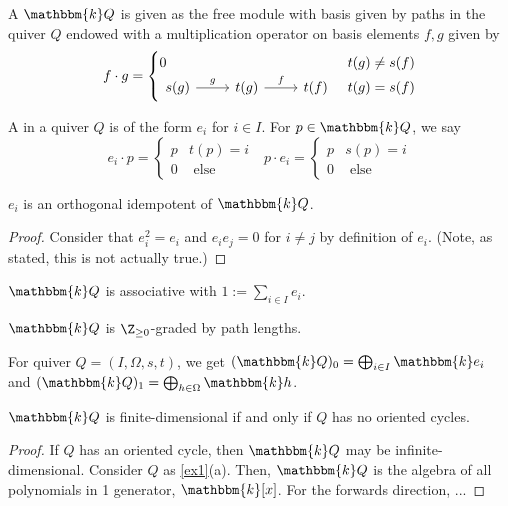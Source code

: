\documentclass[11pt,leqno,oneside]{amsbook}
\numberwithin{thm}{section}
\newcommand{\bbk}{\mathbbm{k}} %
\renewcommand{\Q}{Q} %
\begin{document}
\begin{defn}
  A  \(\bbk \Q\) is given as the free module with
  basis given by paths in the quiver \(\Q\) endowed with a
  multiplication operator on basis elements \(f,g\) given by \[
    f \cdot g = \begin{cases}
      0 & t(g) \neq s(f) \\
      \begin{tikzcd}
        s(g) \arrow[r,"g"] & t(g) \arrow[r,"f"] & t(f)
      \end{tikzcd} & t(g) = s(f)
    \end{cases}
  \]
\end{defn}
\begin{defn}
  A  in a quiver \(\Q\) is of the form \(e_i\) for
  \(i \in I\). For \(p \in \bbk Q\), we say \[
      e_i \cdot p = 
    \begin{cases}
      p & t(p) = i \\
      0 & \text{ else }
    \end{cases} \ \ \ p \cdot e_i =
    \begin{cases}
      p & s(p) = i \\
      0 & \text{ else }
    \end{cases}
  \]
\end{defn}
\begin{prop}
  \(e_i\) is an orthogonal idempotent of \(\bbk \Q\).
\end{prop}
\begin{proof}
  Consider that \(e_i^2 = e_i\) and \(e_i e_j = 0\) for \(i \neq j\)
  by definition of \(e_i\). (Note, as stated, this is not actually true.)
\end{proof}
\begin{prop}
  \(\bbk \Q\) is associative with \(1 := \sum_{i \in I} e_i\). 
\end{prop}
\begin{prop}
  \(\bbk \Q\) is \(\Z_{\geq 0}\)-graded by path lengths.
\end{prop}
\begin{example}
  For quiver \(Q = (I,\Omega,s,t)\), we get \((\bbk Q)_0 =
  \bigoplus_{i \in I} \bbk e_i\) and \((\bbk Q)_1 = 
  \bigoplus_{h \in \Omega} \bbk h\).
\end{example}
\begin{prop}
  \(\bbk \Q\) is finite-dimensional if and only if \(\Q\) has no oriented cycles.
\end{prop}
\begin{proof}
  If \(\Q\) has an oriented cycle, then \(\bbk \Q\) may be
  infinite-dimensional. Consider \(\Q\) as \ref{ex1}(a). Then, \(\bbk
  Q\) is the algebra of all polynomials in 1 generator,
  \(\bbk[x]\). For the forwards direction, ...
\end{proof}
\end{document}
